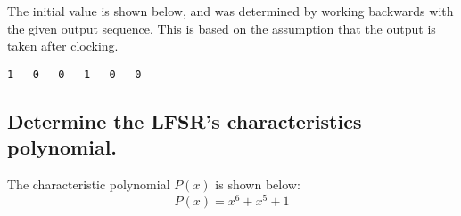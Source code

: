 \documentclass{article}
\begin{document}
The initial value is shown below, and was determined by working backwards with the given output sequence.
This is based on the assumption that the output is taken after clocking.

\begin{verbatim}
1	0	0	1	0	0
\end{verbatim}

\subsection*{Determine the LFSR's characteristics polynomial.}
The characteristic polynomial $P(x)$ is shown below:
\begin{equation}
P(x) = x^6 + x^5 + 1
\end{equation}
\end{document}
